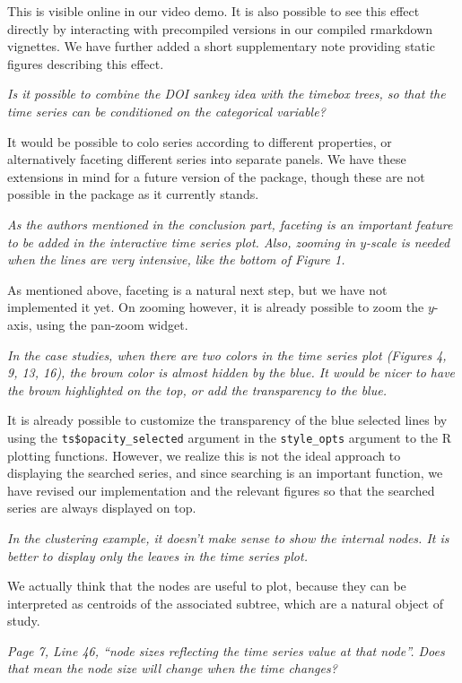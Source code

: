 \documentclass{article}
\begin{document}
This is visible online in our video demo. It is also possible to see this effect
directly by interacting with precompiled versions in our compiled rmarkdown
vignettes. We have further added a short supplementary note providing static
figures describing this effect.

\textit{Is it possible to combine the DOI sankey idea with the timebox trees, so
  that the time series can be conditioned on the categorical variable?}

It would be possible to colo series according to different properties, or
alternatively faceting different series into separate panels. We have these
extensions in mind for a future version of the package, though these are not
possible in the package as it currently stands.

\textit{As the authors mentioned in the conclusion part, faceting is an
  important feature to be added in the interactive time series plot. Also,
  zooming in $y$-scale is needed when the lines are very intensive, like the
  bottom of Figure 1.}

As mentioned above, faceting is a natural next step, but we have not implemented
it yet. On zooming however, it is already possible to zoom the $y$-axis, using
the pan-zoom widget.

\textit{In the case studies, when there are two colors in the time series plot
  (Figures 4, 9, 13, 16), the brown color is almost hidden by the blue. It would
  be nicer to have the brown highlighted on the top, or add the transparency to
  the blue.}

It is already possible to customize the transparency of the blue selected lines
by using the \texttt{ts\$opacity\_selected} argument in the \texttt{style\_opts}
argument to the R plotting functions. However, we realize this is not the ideal
approach to displaying the searched series, and since searching is an important
function, we have revised our implementation and the relevant figures so that
the searched series are always displayed on top.

\textit{In the clustering example, it doesn't make sense to show the internal
  nodes. It is better to display only the leaves in the time series plot.}

We actually think that the nodes are useful to plot, because they can be
interpreted as centroids of the associated subtree, which are a natural object
of study.

\textit{Page 7, Line 46, ``node sizes reflecting the time series value at that
  node''. Does that mean the node size will change when the time changes?}
\end{document}
